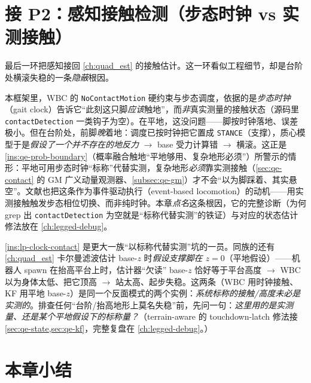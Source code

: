 \section{接 P2：感知接触检测（步态时钟 vs 实测接触）}
\label{sec:lp-contact}

最后一环把感知接回 \cref{ch:quad_est} 的接触估计。这一环看似工程细节，却是台阶处横滚失稳的一条\emph{隐蔽}根因。

\begin{insight}\label{ins:lp-clock-contact}
本框架里，WBC 的 \texttt{NoContactMotion} 硬约束与步态调度，依据的是\emph{步态时钟}（gait clock）告诉它“此刻这只脚\emph{应该}触地”，而\emph{非}真实测量的接触状态（源码里 \texttt{contactDetection} 一类钩子为空）。在平地，这没问题——脚按时钟落地、误差极小。但在台阶处，前脚\emph{晚}着地：调度已按时钟把它置成 \texttt{STANCE}（支撑），质心模型于是\emph{假设了一个并不存在的地反力} $\to$ base 受力计算错 $\to$ 横滚。这正是 \cref{ins:qe-prob-boundary}（概率融合触地“平地够用、复杂地形必须”）所警示的情形：平地可用步态时钟“标称”代替实测，复杂地形\emph{必须}靠实测接触（\cref{sec:qe-contact} 的 GM 广义动量观测器、\cref{subsec:qe-gm}）才不会“以为脚踩着、其实悬空”。文献也把这条作为事件驱动执行（event-based locomotion）的动机\cite{bledt2018contact}——用实测接触触发步态相位切换、而非纯时钟。本章\emph{点名}这条根因，它的完整诊断（为何 grep 出 \texttt{contactDetection} 为空就是“标称代替实测”的铁证）与对应的状态估计修法放在 \cref{ch:legged-debug}。
\end{insight}

\begin{pitfall}\label{pit:lp-nominal-contact}
\cref{ins:lp-clock-contact} 是更大一族“以标称代替实测”坑的一员。同族的还有 \cref{ch:quad_est} 卡尔曼滤波估计 base-$z$ 时\emph{假设支撑脚在 $z=0$}（平地假设）——机器人 spawn 在抬高平台上时，估计器“欠读” base-$z$ 恰好等于平台高度 $\to$ WBC 以为身体太低、把它顶高 $\to$ 站太高、起步失稳。这两条（WBC 用时钟接触、KF 用平地 base-$z$）是同一个反面模式的两个实例：\emph{系统标称的接触/高度未必是实测的}。排查任何“台阶/抬高地形上莫名失稳”前，先问一句：\emph{这里用的是实测量、还是某个平地假设下的标称量？}（terrain-aware 的 touchdown-latch 修法接 \cref{sec:qe-state,sec:qe-kf}，完整复盘在 \cref{ch:legged-debug}。）
\end{pitfall}

\section*{本章小结}
\label{sec:lp-summary}

